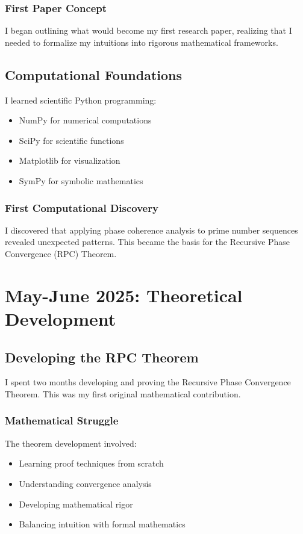 \documentclass[12pt]{article}
\begin{document}
\subsubsection{First Paper Concept}

I began outlining what would become my first research paper, realizing that I needed to formalize my intuitions into rigorous mathematical frameworks.

\subsection{Computational Foundations}

I learned scientific Python programming:
\begin{itemize}
    \item NumPy for numerical computations
    \item SciPy for scientific functions
    \item Matplotlib for visualization
    \item SymPy for symbolic mathematics
\end{itemize}

\subsubsection{First Computational Discovery}

I discovered that applying phase coherence analysis to prime number sequences revealed unexpected patterns. This became the basis for the Recursive Phase Convergence (RPC) Theorem.

\section{May-June 2025: Theoretical Development}

\subsection{Developing the RPC Theorem}

I spent two months developing and proving the Recursive Phase Convergence Theorem. This was my first original mathematical contribution.

\subsubsection{Mathematical Struggle}

The theorem development involved:
\begin{itemize}
    \item Learning proof techniques from scratch
    \item Understanding convergence analysis
    \item Developing mathematical rigor
    \item Balancing intuition with formal mathematics
\end{itemize}
\end{document}

